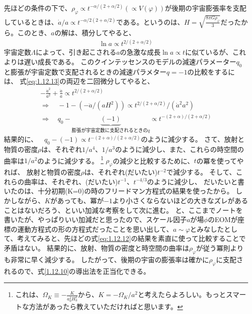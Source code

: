 \documentclass[11pt]{ltjsarticle}
\theoremstyle{plain}
\theoremstyle{break}
\begin{document}
先ほどの条件の下で、$\rho_{\varphi} \propto t^{-\alpha /(2+\alpha / 2)} (\propto V(\varphi))$が後期の宇宙膨張率を支配しているときは、$\dot{a} / a \propto t^{-\alpha / 2(2+\alpha / 2)}$である。というのは、$H = \sqrt{\frac{8\pi G \rho_{\varphi}}{3}}$だったから。このとき、$a$の解は、積分してやると、
\begin{align}
  \ln a \propto t^{2 /(2+\alpha / 2)}  \label{eq:1.12.13}
\end{align}%
宇宙定数$\Lambda$によって、引き起こされる$a$の急激な成長$\ln a \propto t$に似ているが、これよりは遅い成長である。
このクインテッセンスのモデルの減速パラメーター$q_0$と膨張が宇宙定数で支配されるときの減速パラメター$q = -1$の比較をするには、
式\eqref{eq:1.12.13}の両辺を二回微分してやると、
\begin{align}
  -\frac{\dot{a}^2}{a^2} + \frac{\ddot{a}}{a} \propto t^{2/(2+\alpha/2)}\\
  \Rightarrow \quad -1 -(- \ddot{a}/(a H^2)) \propto t^{2/(2+\alpha/2)}/(\dot{a}^2 a^2 )\\
  \Rightarrow \quad  q_0 -  \underbrace{(-1)}_{膨張が宇宙定数に支配されるときのq} \propto t^{-(2+\alpha) /(2+\alpha / 2)}
\end{align}%
結果的に、$\quad  q_0 -  (-1)\propto t^{-(2+\alpha) /(2+\alpha / 2)}$のように減少する。
さて、放射と物質の密度$\rho$は、それぞれ$1 / a^{4} 、1 / a^{3}$のように減少し、また、これらの時空間の曲率は$1 / a^{2}$のように減少する。
\footnote{これは、$\Omega_K \equiv -\frac{K}{a_0^2 H_0^2}$から、$K = -\Omega_K /a^2$と考えたらよろしい。もっとスマートな方法があったら教えていただければと思います。}
$\rho_\varphi$の減少と比較するために、$t$の冪を使ってやれば、
放射と物質の密度$\rho$は、それぞれ(だいたい)$t^{-2}$で減少する。
そして、これらの曲率は、それぞれ、(だいたい)$t^{-1}、t^{-4/3}$のように減少し、
だいたいと書いたのは、十分初期(K=0)の時のフリードマン方程式の結果を使ったから。
しかしながら、$K$があっても、冪が$-1$より小さくならないほどの大きなズレがあることはないだろう、といい加減な考察をして次に進む。
と、ここまでノートを書いたが、やっぱりいい加減だと思ったので、スケール因子$a$が場$\phi$のEOMが座標の運動方程式の形の方程式だったことを思い出して、$a \sim \varphi$とみなしたとして、考えてみると、先ほどの式\eqref{eq:1.12.12}の結果を素直に使って比較することで矛盾はない。
結果的に、放射、物質の密度と時空間の曲率は$\rho_{\varphi}$が従う冪則よりも非常に早く減少する。
したがって、後期の宇宙の膨張率は確かに$\rho_{\varphi}$に支配されるので、式\eqref{1.12.10}の導出法を正当化できる。
\end{document}
